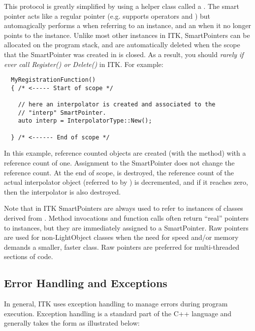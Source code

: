 This protocol is greatly simplified by using a helper class called a
. The smart pointer acts like a regular pointer
(e.g. supports operators \code{->} and \code{*}) but automagically performs a
 when referring to an instance, and an 
when it no longer points to the instance. Unlike most other instances in
ITK, SmartPointers can be allocated on the program stack, and are
automatically deleted when the scope that the SmartPointer was created in
is closed. As a result, you should \emph{rarely if ever call Register() or
Delete()} in ITK. For example:

\small
\begin{verbatim}
  MyRegistrationFunction()
  { /* <----- Start of scope */

    // here an interpolator is created and associated to the
    // "interp" SmartPointer.
    auto interp = InterpolatorType::New();

  } /* <------ End of scope */
\end{verbatim}
\normalsize

In this example, reference counted objects are created (with the 
method) with a reference count of one. Assignment to the SmartPointer
 does not change the reference count. At the end of scope,
 is destroyed, the reference count of the actual interpolator
object (referred to by ) is decremented, and if it reaches zero,
then the interpolator is also destroyed.

Note that in ITK SmartPointers are always used to refer to instances of
classes derived from . Method invocations and function
calls often return ``real'' pointers to instances, but they are immediately
assigned to a SmartPointer. Raw pointers are used for non-LightObject classes when
the need for speed and/or memory demands a smaller, faster class. Raw pointers
are preferred for multi-threaded sections of code.


\subsection{Error Handling and Exceptions}
\label{sec:ErrorHandling}


In general, ITK uses exception handling to manage errors during program
execution. Exception handling is a standard part of the C++ language and
generally takes the form as illustrated below:

